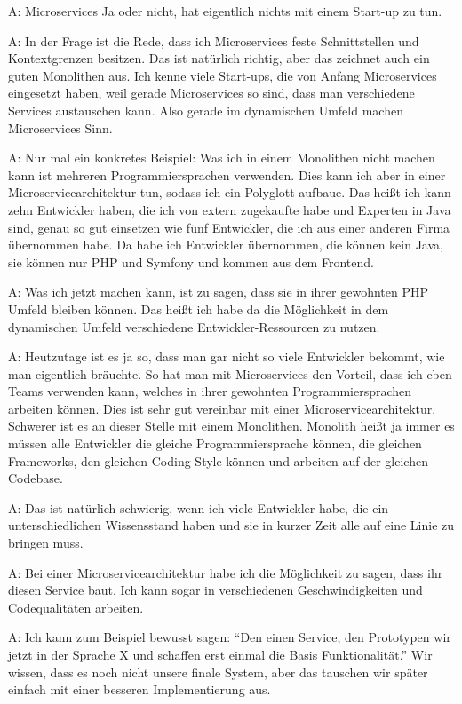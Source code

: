 A: Microservices Ja oder nicht, hat eigentlich nichts mit einem Start-up zu tun.

A: In der Frage ist die Rede, dass ich Microservices feste Schnittstellen und Kontextgrenzen besitzen. Das ist natürlich richtig, aber das zeichnet auch ein guten Monolithen aus. Ich kenne viele Start-ups, die von Anfang Microservices eingesetzt haben, weil gerade Microservices so sind, dass man verschiedene Services austauschen kann. Also gerade im dynamischen Umfeld machen Microservices Sinn.

A: Nur mal ein konkretes Beispiel: Was ich in einem Monolithen nicht machen kann ist mehreren Programmiersprachen verwenden. Dies kann ich aber in einer Microservicearchitektur tun, sodass ich ein Polyglott aufbaue. Das heißt ich kann zehn Entwickler haben, die ich von extern zugekaufte habe und Experten in Java sind, genau so gut einsetzen wie fünf Entwickler, die ich aus einer anderen Firma übernommen habe. Da habe ich Entwickler übernommen, die können kein Java, sie können nur PHP und Symfony und kommen aus dem Frontend.

A: Was ich jetzt machen kann, ist zu sagen, dass sie in ihrer gewohnten PHP Umfeld bleiben können. Das heißt ich habe da die Möglichkeit in dem dynamischen Umfeld verschiedene Entwickler-Ressourcen zu nutzen.

A: Heutzutage ist es ja so, dass man gar nicht so viele Entwickler bekommt, wie man eigentlich bräuchte. So hat man mit Microservices den Vorteil, dass ich eben Teams verwenden kann, welches in ihrer gewohnten Programmiersprachen arbeiten können. Dies ist sehr gut vereinbar mit einer Microservicearchitektur. Schwerer ist es an dieser Stelle mit einem Monolithen. Monolith heißt ja immer es müssen alle Entwickler die gleiche Programmiersprache können, die gleichen Frameworks, den gleichen Coding-Style können und arbeiten auf der gleichen Codebase.

A: Das ist natürlich schwierig, wenn ich viele Entwickler habe, die ein unterschiedlichen Wissensstand haben und sie in kurzer Zeit alle auf eine Linie zu bringen muss.

A: Bei einer Microservicearchitektur habe ich die Möglichkeit zu sagen, dass ihr diesen Service baut. Ich kann sogar in verschiedenen Geschwindigkeiten und Codequalitäten arbeiten.

A: Ich kann zum Beispiel bewusst sagen: “Den einen Service, den Prototypen wir jetzt in der Sprache X und schaffen erst einmal die Basis Funktionalität.” Wir wissen, dass es noch nicht unsere finale System, aber das tauschen wir später einfach mit einer besseren Implementierung aus.

